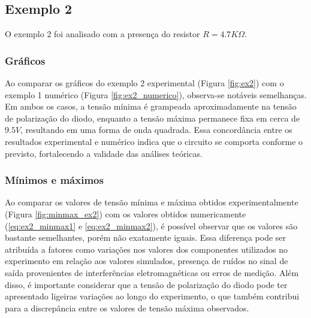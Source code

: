 \subsection{Exemplo 2}

O exemplo 2 foi analisado com a presença do resistor $R = 4.7K \Omega$.

\subsubsection{Gráficos}

Ao comparar os gráficos do exemplo 2 experimental (Figura \ref{fig:ex2}) com o exemplo 1 numérico (Figura \ref{fig:ex2_numerico}), observa-se notáveis semelhanças. Em ambos os casos, a tensão mínima é grampeada aproximadamente na tensão de polarização do diodo, enquanto a tensão máxima permanece fixa em cerca de $9.5V$, resultando em uma forma de onda quadrada. Essa concordância entre os resultados experimental e numérico indica que o circuito se comporta conforme o previsto, fortalecendo a validade das análises teóricas.

\subsubsection{Mínimos e máximos}

Ao comparar os valores de tensão mínima e máxima obtidos experimentalmente (Figura \ref{fig:minmax_ex2}) com os valores obtidos numericamente (\ref{eq:ex2_minmax1} e \ref{eq:ex2_minmax2}), é possível observar que os valores são bastante semelhantes, porém não exatamente iguais. Essa diferença pode ser atribuída a fatores como variações nos valores dos componentes utilizados no experimento em relação aos valores simulados, presença de ruídos no sinal de saída provenientes de interferências eletromagnéticas ou erros de medição. Além disso, é importante considerar que a tensão de polarização do diodo pode ter apresentado ligeiras variações ao longo do experimento, o que também contribui para a discrepância entre os valores de tensão máxima observados.